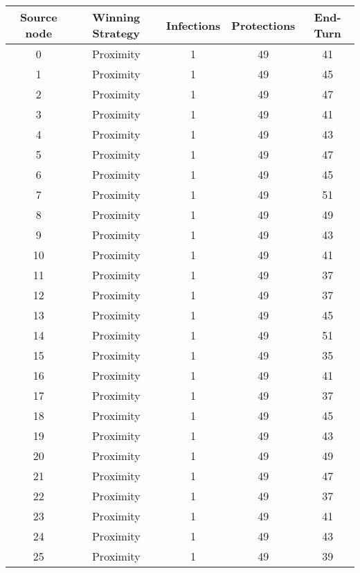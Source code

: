 \documentclass[results.tex]{subfiles}
\begin{document}
\begin{center}
  \begin{tabular}{| c || c | c | c | c |}
    \hline
    {\bfseries Source node} & {\bfseries Winning Strategy} & {\bfseries Infections} & {\bfseries Protections} & {\bfseries End-Turn} \\  %
    \hline\hline
    0 & Proximity & 1 & 49 & 41 \\ 
    \hline
    1 & Proximity & 1 & 49 & 45 \\ 
    \hline
    2 & Proximity & 1 & 49 & 47 \\ 
    \hline
    3 & Proximity & 1 & 49 & 41 \\ 
    \hline
    4 & Proximity & 1 & 49 & 43 \\ 
    \hline
    5 & Proximity & 1 & 49 & 47 \\ 
    \hline
    6 & Proximity & 1 & 49 & 45 \\ 
    \hline
    7 & Proximity & 1 & 49 & 51 \\ 
    \hline
    8 & Proximity & 1 & 49 & 49 \\ 
    \hline
    9 & Proximity & 1 & 49 & 43 \\ 
    \hline
    10 & Proximity & 1 & 49 & 41 \\ 
    \hline
    11 & Proximity & 1 & 49 & 37 \\ 
    \hline
    12 & Proximity & 1 & 49 & 37 \\ 
    \hline
    13 & Proximity & 1 & 49 & 45 \\ 
    \hline
    14 & Proximity & 1 & 49 & 51 \\ 
    \hline
    15 & Proximity & 1 & 49 & 35 \\ 
    \hline
    16 & Proximity & 1 & 49 & 41 \\ 
    \hline
    17 & Proximity & 1 & 49 & 37 \\ 
    \hline
    18 & Proximity & 1 & 49 & 45 \\ 
    \hline
    19 & Proximity & 1 & 49 & 43 \\ 
    \hline
    20 & Proximity & 1 & 49 & 49 \\ 
    \hline
    21 & Proximity & 1 & 49 & 47 \\ 
    \hline
    22 & Proximity & 1 & 49 & 37 \\ 
    \hline
    23 & Proximity & 1 & 49 & 41 \\ 
    \hline
    24 & Proximity & 1 & 49 & 43 \\ 
    \hline
    25 & Proximity & 1 & 49 & 39 \\ 

\end{tabular}
\end{center}
\end{document}
